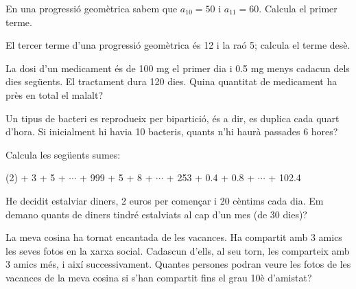 \begin{extrapage}
\begin{mylist}
	\item En una progressió geomètrica sabem que $a_{10}=50$ i $a_{11}=60$. Calcula el primer terme.
	  
	\item El tercer terme d'una progressió geomètrica és 12 i la raó 5; calcula el terme desè.
	
	\item La dosi d'un medicament és de 100 mg el primer dia i 0.5 mg menys cadacun dels dies següents. El tractament dura 120 dies. Quina quantitat de medicament ha près en total el malalt?
	
	\item Un tipus de bacteri es reprodueix per bipartició, és a dir, es duplica cada quart d'hora. Si inicialment hi havia 10 bacteris, quants n'hi haurà passades 6 hores?
	
	\item Calcula les següents sumes:
	\begin{tasks}(2)
		 + 3 + 5 + $\cdots$ + 999
		 + 5 + 8 + $\cdots$ + 253
		 + 0.4 + 0.8 + $\cdots$ + 102.4
	\end{tasks}


	\item He decidit estalviar diners, 2 euros per començar i 20 cèntims cada dia. Em demano quants de diners tindré estalviats al cap d'un mes (de 30 dies)?
	
	
	\item La meva cosina ha tornat encantada de les vacances. Ha compartit amb 3 amics les seves fotos en la xarxa social. Cadascun d'ells, al seu torn, les comparteix amb 3 amics més, i així successivament. Quantes persones podran veure les fotos de les vacances de la meva cosina si s'han compartit fins el grau 10è d'amistat?
	
	
\end{mylist}


\end{extrapage}